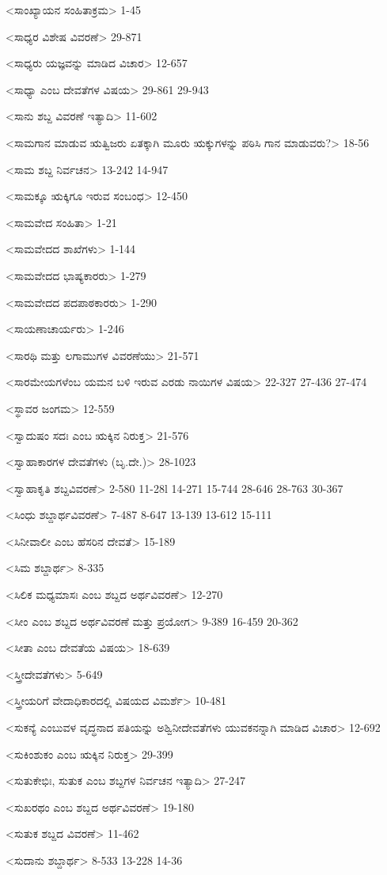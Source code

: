 <ಸಾಂಖ್ಯಾಯನ ಸಂಹಿತಾಕ್ರಮ>
1-45

<ಸಾಧ್ಯರ ವಿಶೇಷ ವಿವರಣೆ>
29-871

<ಸಾಧ್ಯರು ಯಜ್ಞವನ್ನು ಮಾಡಿದ ವಿಚಾರ>
12-657

<ಸಾಧ್ಯಾ ಎಂಬ ದೇವತೆಗಳ ವಿಷಯ>
29-861
29-943

<ಸಾನು ಶಬ್ದ ವಿವರಣೆ ಇತ್ಯಾದಿ>
11-602


<ಸಾಮಗಾನ ಮಾಡುವ ಋತ್ವಿಜರು ಏತಕ್ಕಾಗಿ ಮೂರು ಋಕ್ಕುಗಳನ್ನು ಪಠಿಸಿ ಗಾನ ಮಾಡುವರು?>
18-56

<ಸಾಮ ಶಬ್ದ ನಿರ್ವಚನ>
13-242
14-947

<ಸಾಮಕ್ಕೂ ಋಕ್ಕಿಗೂ ಇರುವ ಸಂಬಂಧ>
12-450

<ಸಾಮವೇದ ಸಂಹಿತಾ>
1-21

<ಸಾಮವೇದದ ಶಾಖೆಗಳು>
1-144

<ಸಾಮವೇದದ ಭಾಷ್ಯಕಾರರು>
1-279

<ಸಾಮವೇದದ ಪದಪಾಠಕಾರರು>
1-290

<ಸಾಯಣಾಚಾರ್ಯರು>
1-246

<ಸಾರಥಿ ಮತ್ತು ಲಗಾಮುಗಳ ವಿವರಣೆಯು>
21-571

<ಸಾರಮೇಯಗಳೆಂಬ ಯಮನ ಬಳಿ ಇರುವ ಎರಡು ನಾಯಿಗಳ ವಿಷಯ>
22-327 
27-436
27-474

<ಸ್ಥಾವರ ಜಂಗಮ>
12-559

<ಸ್ವಾದುಷಂ ಸದಃ ಎಂಬ ಋಕ್ಕಿನ ನಿರುಕ್ತ>
21-576

<ಸ್ವಾಹಾಕಾರಗಳ ದೇವತೆಗಳು (ಬೃ.ದೇ.)>
28-1023

<ಸ್ವಾಹಾಕೃತಿ ಶಬ್ದವಿವರಣೆ>
2-580
11-28l
14-271
15-744 
28-646
28-763
30-367

<ಸಿಂಧು ಶಬ್ದಾರ್ಥವಿವರಣೆ>
7-487 
8-647
13-139 
13-612
15-111


<ಸಿನೀವಾಲೀ ಎಂಬ ಹೆಸರಿನ ದೇವತೆ>
15-189

<ಸಿಮ ಶಬ್ದಾರ್ಥ>
8-335

<ಸಿಲಿಕ ಮಧ್ಯಮಾಸಃ ಎಂಬ ಶಬ್ದದ ಅರ್ಥವಿವರಣೆ>
12-270

<ಸೀಂ ಎಂಬ ಶಬ್ದದ ಅರ್ಥವಿವರಣೆ ಮತ್ತು ಪ್ರಯೋಗ>
9-389
16-459
20-362

<ಸೀತಾ ಎಂಬ ದೇವತೆಯ ವಿಷಯ>
18-639

<ಸ್ತ್ರೀದೇವತೆಗಳು>
5-649

<ಸ್ತ್ರೀಯರಿಗೆ ವೇದಾಧಿಕಾರದಲ್ಲಿ ವಿಷಯದ ವಿಮರ್ಶೆ>
10-481

<ಸುಕನ್ಯೆ ಎಂಬುವಳ ವೃದ್ಧನಾದ ಪತಿಯನ್ನು ಅಶ್ವಿನೀದೇವತೆಗಳು ಯುವಕನನ್ನಾಗಿ ಮಾಡಿದ ವಿಚಾರ>
12-692

<ಸುಕಿಂಶುಕಂ ಎಂಬ ಋಕ್ಕಿನ ನಿರುಕ್ತ>
29-399

<ಸುತುಕೇಭಿಃ, ಸುತುಕ ಎಂಬ ಶಬ್ದಗಳ ನಿರ್ವಚನ ಇತ್ಯಾದಿ>
27-247

<ಸುಖರಥಂ ಎಂಬ ಶಬ್ದದ ಅರ್ಥವಿವರಣೆ>
19-180

<ಸುತುಕ ಶಬ್ದದ ವಿವರಣೆ>
11-462

<ಸುದಾನು ಶಬ್ದಾರ್ಥ>
8-533 
13-228
14-36

